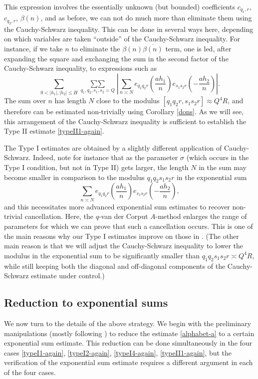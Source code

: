 \documentclass[12pt,a4paper,reqno]{amsart}
\numberwithin{equation}{section}
\theoremstyle{plain}
\theoremstyle{definition}
\newcommand\sumsum{\mathop{\sum\sum}\limits}
\renewcommand{\sim}{\asymp}
\begin{document}
This expression involves the essentially unknown (but bounded)
coefficients $c_{q_1,r}$, $c_{q_2,r}$, $\beta(n)$, and as before, we
can not do much more than eliminate them using the Cauchy-Schwarz
inequality.  This can be done in several ways here, depending on which
variables are taken ``outside'' of the Cauchy-Schwarz inequality. For
instance, if we take $n$ to eliminate the $\beta(n)
\overline{\beta(n)}$ term, one is led, after expanding the square and
exchanging the sum in the second factor of the Cauchy-Schwarz
inequality, to expressions such as
$$ 
\sum_{0 < |h_1|, |h_2| \leq H} \sumsum_{q_1,q_2,s_1,s_2\sim Q} \left|
  \sum_{n \sim N} e_{q_1q_2 r}\left(\frac{ah_1}{n}\right) e_{s_1s_2r}
  \left(-\frac{ah_2}{n}\right)\right|.
$$ 
The sum over $n$ has length $N$ close to the modulus
$[q_1q_2r,s_1s_2r]\approx Q^4R$, and therefore can be estimated
non-trivially using Corollary \ref{dons}. As we will see, this
arrangement of the Cauchy-Schwarz inequality is sufficient to
establish the Type II estimate \eqref{typeII1-again}.
\par
The Type I estimates are obtained by a slightly different application
of Cauchy-Schwarz. Indeed, note for instance that as the parameter
$\sigma$ (which occurs in the Type I condition, but not in Type II)
gets larger, the length $N$ in the sum may become smaller in
comparison to the modulus $q_1 q_2s_1s_2r$ in the
exponential sum
$$
\sum_{n \sim N} e_{q_1q_2 r}\left(\frac{ah_1}{n}\right) e_{s_1 s_2
  r}\left(-\frac{a h_2}{n}\right),
$$ 
and this necessitates more advanced exponential sum estimates to
recover non-trivial cancellation. Here, the $q$-van der Corput
$A$-method enlarges the range of parameters for which we can prove
that such a cancellation occurs. This is one of the main reasons why
our Type I estimates improve on those in \cite{zhang}.  (The other
main reason is that we will adjust the Cauchy-Schwarz inequality to
lower the modulus in the exponential sum to be significantly smaller
than $q_1 q_2s_1s_2 r \sim Q^4 R$, while still keeping both the
diagonal and off-diagonal components of the Cauchy-Schwarz estimate
under control.)

\subsection{Reduction to exponential sums}\label{prelim-red}

We now turn to the details of the above strategy.  We begin with the
preliminary manipulations (mostly following \cite{zhang}) to reduce
the estimate \eqref{alphabet-a} to a certain exponential sum
estimate. This reduction can be done simultaneously in the four cases
\eqref{typeI1-again}, \eqref{typeI2-again}, \eqref{typeI4-again},
\eqref{typeII1-again}, but the verification of the exponential sum
estimate requires a different argument in each of the four cases.
\end{document}
